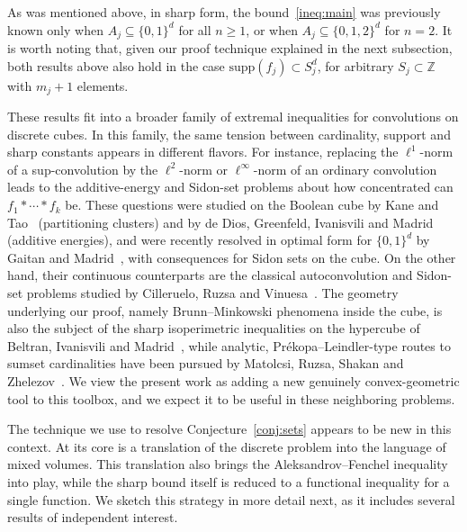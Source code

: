 \documentclass[a4paper,reqno,12pt]{amsart}
\newcommand{\z}{\mathbb{Z}}
\newcommand{\1}{\bo{1}}
\begin{document}
As was mentioned above, in sharp form, the bound~\eqref{ineq:main} was previously known only when $A_j \subseteq \{0,1\}^d$ for all $n\geq 1$, or when $A_j \subseteq\{0,1,2\}^d$ for $n=2$. It is worth noting that, given our proof technique explained in the next subsection, both results above also hold in the case $\text{supp}(f_j) \subset S_j^d$, for arbitrary $S_j \subset \z$ with $m_j+1$ elements.

These results fit into a broader family of extremal inequalities for convolutions on discrete cubes. In this family, the same tension between cardinality, support and sharp constants appears in different flavors. For instance, replacing the $\ell^1$-norm of a sup-convolution by the $\ell^2$-norm or $\ell^\infty$-norm of an ordinary convolution leads to the {additive-energy} and {Sidon-set} problems about how concentrated can $f_1*\cdots*f_k$ be. These questions were studied on the
Boolean cube by Kane and Tao~\cite{Ka-Ta} (partitioning clusters) and by
de Dios, Greenfeld, Ivanisvili and Madrid~\cite{DGIM} (additive energies), and
were recently resolved in optimal form for $\{0,1\}^d$ by Gaitan and
Madrid~\cite{Ga-Ma}, with consequences for Sidon sets on the cube. On the other hand, their continuous counterparts are the classical autoconvolution and Sidon-set problems studied by Cilleruelo, Ruzsa and Vinuesa~\cite{Ci-Ru-Vi}. The geometry underlying our
proof, namely Brunn--Minkowski phenomena inside the cube, is also the subject
of the sharp isoperimetric inequalities on the hypercube of Beltran,
Ivanisvili and Madrid~\cite{Be-Iv-Ma}, while analytic, Prékopa--Leindler-type
routes to sumset cardinalities have been pursued by Matolcsi, Ruzsa, Shakan
and Zhelezov~\cite{MRSZ}. We view the present work as adding a new genuinely
convex-geometric tool to this toolbox, and we expect it to be useful in these
neighboring problems.

The technique we use to resolve Conjecture~\ref{conj:sets} appears to be new in this context. At its core is a translation of the discrete problem into the language of mixed volumes. This translation also brings the Aleksandrov--Fenchel inequality into play, while the sharp bound itself is reduced to a functional inequality for a single function. We sketch this strategy in more detail next, as it includes several results of independent interest.
\end{document}
